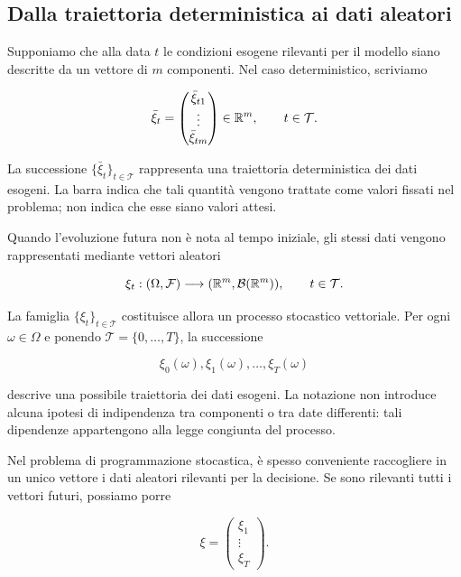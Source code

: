 \subsection{Dalla traiettoria deterministica ai dati aleatori}

Supponiamo che alla data $t$ le condizioni esogene rilevanti per il modello
siano descritte da un vettore di $m$ componenti. Nel caso deterministico,
scriviamo

\begin{equation}
\bar\xi_t
=
\begin{pmatrix}
\bar\xi_{t1}\\
\vdots\\
\bar\xi_{tm}
\end{pmatrix}
\in\mathbb{R}^m,
\qquad
t\in\mathcal T.
\label{eq:cap14-dati-deterministici}
\end{equation}

La successione
$\{\bar\xi_t\}_{t\in\mathcal T}$
rappresenta una traiettoria deterministica dei dati esogeni. La barra indica
che tali quantit\`a vengono trattate come valori fissati nel problema; non
indica che esse siano valori attesi.

Quando l'evoluzione futura non \`e nota al tempo iniziale, gli stessi dati
vengono rappresentati mediante vettori aleatori

\begin{equation}
\xi_t:
(\Omega,\mathcal{F})
\longrightarrow
(\mathbb{R}^m,\mathcal{B}(\mathbb{R}^m)),
\qquad
t\in\mathcal T.
\label{eq:cap14-processo-dati}
\end{equation}

La famiglia
$\{\xi_t\}_{t\in\mathcal T}$
costituisce allora un processo stocastico vettoriale. Per ogni
$\omega\in\Omega$ e ponendo  $\mathcal T = \{0,\dots,T\}$, la successione

\[
\xi_0(\omega),\xi_1(\omega),\ldots,\xi_T(\omega)
\]

\noindent descrive una possibile traiettoria dei dati esogeni. La notazione non
introduce alcuna ipotesi di indipendenza tra componenti o tra date
differenti: tali dipendenze appartengono alla legge congiunta del processo.

Nel problema di programmazione stocastica, \`e spesso conveniente raccogliere
in un unico vettore i dati aleatori rilevanti per la decisione. Se sono
rilevanti tutti i vettori futuri, possiamo porre

\begin{equation}
\xi
=
\begin{pmatrix}
\xi_1\\
\vdots\\
\xi_T
\end{pmatrix}.
\label{eq:cap14-vettore-dati-aleatori}
\end{equation}

